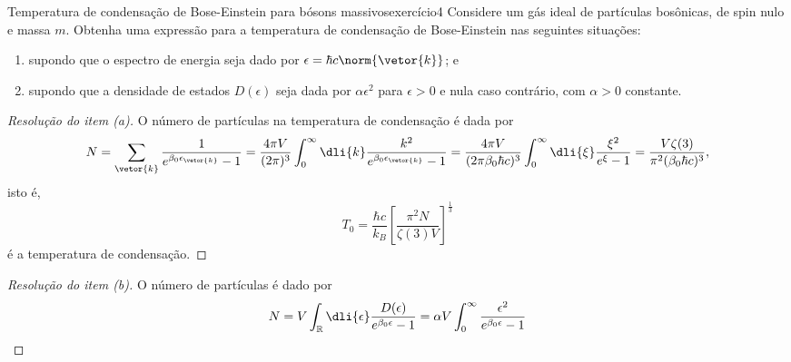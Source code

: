 \begin{exercício}{Temperatura de condensação de Bose-Einstein para bósons massivos}{exercício4}
    Considere um gás ideal de partículas bosônicas, de spin nulo e massa \(m\). Obtenha uma expressão para a temperatura de condensação de Bose-Einstein nas seguintes situações:
    \begin{enumerate}[label=(\alph*)]
        \item supondo que o espectro de energia seja dado por \(\epsilon = \hbar c \norm{\vetor{k}}\); e
        \item supondo que a densidade de estados \(D(\epsilon)\) seja dada por \(\alpha \epsilon^2\) para \(\epsilon > 0\) e nula caso contrário, com \(\alpha > 0\) constante.
    \end{enumerate}
\end{exercício}
\begin{proof}[Resolução do item (a)]
    O número de partículas na temperatura de condensação é dada por
    \begin{equation*}
        N = \sum_{\vetor{k}} \frac{1}{e^{\beta_0 \epsilon_{\vetor{k}}} - 1} = \frac{4\pi V}{(2\pi)^3} \int_0^\infty \dli{k} \frac{k^2}{e^{\beta_0 \epsilon_{\vetor{k}}} - 1} = \frac{4\pi V}{(2\pi \beta_0 \hbar c)^3} \int_0^\infty \dli{\xi} \frac{\xi^2}{e^{\xi} - 1} = \frac{V \zeta(3)}{\pi^2(\beta_0 \hbar c)^3},
    \end{equation*}
    isto é,
    \begin{equation*}
        T_0 = \frac{\hbar c}{k_B}\left[\frac{\pi^2 N}{\zeta(3)V}\right]^{\frac13}
    \end{equation*}
    é a temperatura de condensação.
\end{proof}
\begin{proof}[Resolução do item (b)]
    O número de partículas é dado por
    \begin{equation*}
        N = V\int_{\mathbb{R}} \dli{\epsilon} \frac{D(\epsilon)}{e^{\beta_0 \epsilon} - 1} = \alpha V \int_{0}^{\infty} \frac{\epsilon^2}{e^{\beta_0 \epsilon} - 1}
    \end{equation*}
\end{proof}
